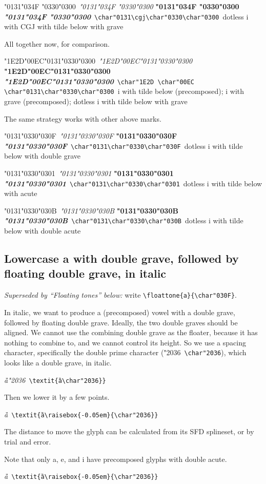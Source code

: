 \documentclass[landscape]{article}
\newcommand{\gs}{\hspace{0.5mm}}	%
\newcommand{\ribbiline}[1]{#1\ 
	{\itshape #1}
	{\bfseries #1}
	{\itshape\bfseries #1}}
\newcommand{\cgj}{\char"034F }
\newcommand{\nbsp}{\char"00A0 }
\newcommand{\floattone}[2]{#1\cgj#2\nbsp#2}
\begin{document}
\ribbiline{\char"0131\cgj\char"0330\char"0300}\ 
\verb|\char"0131\cgj\char"0330\char"0300|\
dotless i with CGJ with tilde below with grave 

All together now, for comparison.

\ribbiline{\char"1E2D\gs \char"00EC\gs \char"0131\char"0330\char"0300}\ 
\verb|\char"1E2D \char"00EC \char"0131\char"0330\char"0300|\
i with tilde below (precomposed); i with grave (precomposed); dotless i with tilde below with grave 

The same strategy works with other above marks.

\ribbiline{\char"0131\char"0330\char"030F}\ 
\verb|\char"0131\char"0330\char"030F|\
dotless i with tilde below with double grave 

\ribbiline{\char"0131\char"0330\char"0301}\ 
\verb|\char"0131\char"0330\char"0301|\
dotless i with tilde below with acute

\ribbiline{\char"0131\char"0330\char"030B}\ 
\verb|\char"0131\char"0330\char"030B|\
dotless i with tilde below with double acute


\subsection*{Lowercase a with double grave, followed by floating double grave, in italic}

\textit{Superseded by ``Floating tones'' below:} write \verb|\floattone{a}{\char"030F}|.

In italic, we want to produce a (precomposed) vowel with a double grave, followed by floating double grave.
Ideally, the two double graves should be aligned.
We cannot use the combining double grave as the floater, because it has nothing to combine to, 
and we cannot control its height.
So we use a spacing character, specifically the double prime character (\char"2036\ \verb|\char"2036|), 
which looks like a double grave, in italic.

\textit{ȁ\char"2036}\ \verb|\textit{ȁ\char"2036}}|

Then we lower it by a few points.

\textit{ȁ}\ \verb|\textit{ȁ\raisebox{-0.05em}{\char"2036}}|

The distance to move the glyph can be calculated from its SFD splineset, or by trial and error.

Note that only a, e, and i have precomposed glyphs with double acute.

\textit{ȁ\raisebox{-0.05em}{\char"2036}}\ \verb|\textit{ȁ\raisebox{-0.05em}{\char"2036}}|
\end{document}
